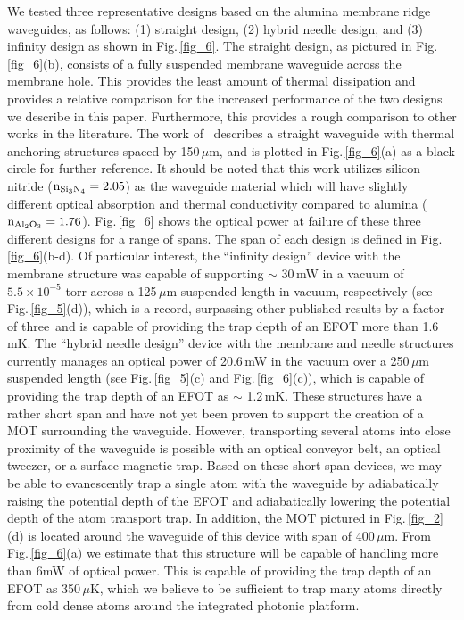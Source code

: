 \documentclass{osa-article}
\begin{document}
We tested three representative designs based on the alumina membrane ridge waveguides, as follows: (1) straight design, (2) hybrid needle design, and (3) infinity design as shown in Fig.\,\ref{fig_6}. The straight design, as pictured in Fig.\,\ref{fig_6}(b), consists of a fully suspended membrane waveguide across the membrane hole. This provides the least amount of thermal dissipation and provides a relative comparison for the increased performance of the two designs we describe in this paper.  Furthermore, this provides a rough comparison to other works in the literature.  The work of \,\cite{Kimble20} describes a straight waveguide with thermal anchoring structures spaced by 150\,$\mu$m, and is plotted in Fig.\,\ref{fig_6}(a) as a black circle for further reference. It should be noted that this work utilizes silicon nitride ($\rm{n_{\rm{Si_{3}N_{4}}}=2.05}$) as the waveguide material which will have slightly different optical absorption and thermal conductivity compared to alumina ($\rm{n_{\rm{Al_{2}O_{3}}}=1.76}$).  Fig.\,\ref{fig_6} shows the optical power at failure of these three different designs for a range of spans.  The span of each design is defined in Fig.\,\ref{fig_6}(b-d).  Of particular interest, the ``infinity design'' device with the membrane structure was capable of supporting $\sim$ 30\,mW in a vacuum of $5.5 \times 10^{-5}$ torr across a 125\,$\mu$m suspended length in vacuum, respectively (see Fig.\,\ref{fig_5}(d)), which is a record, surpassing other published results by a factor of three\,\cite{Kimble20} and is capable of providing the trap depth of an EFOT more than 1.6\,mK. The ``hybrid needle design'' device with the membrane and needle structures currently manages an optical power of 20.6\,mW in the vacuum over a 250\,$\mu$m suspended length (see Fig.\,\ref{fig_5}(c) and Fig.\,\ref{fig_6}(c)), which is capable of providing the trap depth of an EFOT as $\sim$ 1.2\,mK. These structures have a rather short span and have not yet been proven to support the creation of a MOT surrounding the waveguide. However, transporting several atoms into close proximity of the waveguide is possible with an optical conveyor belt, an optical tweezer, or a surface magnetic trap. Based on these short span devices, we may be able to evanescently trap a single atom with the waveguide by adiabatically raising the potential depth of the EFOT and adiabatically lowering the potential depth of the atom transport trap. In addition, the MOT pictured in Fig.\,\ref{fig_2}(d) is located around the waveguide of this device with span of 400\,$\mu$m. From Fig.\,\ref{fig_6}(a) we estimate that this structure will be capable of handling more than 6mW of optical power. This is capable of providing the trap depth of an EFOT as 350\,$\mu$K, which we believe to be sufficient to trap many atoms directly from cold dense atoms around the integrated photonic platform.
\end{document}
